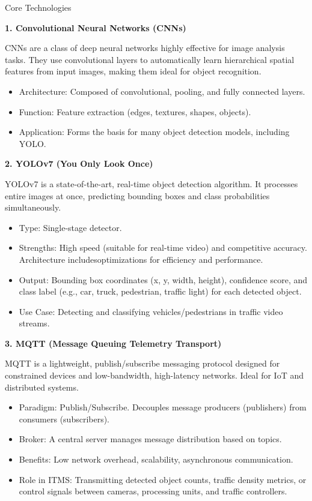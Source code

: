 \documentclass[final]{beamer}
\newlength{\colwidth}
\begin{document}
\begin{frame}[t]
\begin{columns}[t]
\begin{column}{\colwidth}
  \begin{block}{Core Technologies}

    
    \textbf{1. Convolutional Neural Networks (CNNs)} \par
    CNNs are a class of deep neural networks highly effective for image analysis tasks. They use convolutional layers to automatically learn hierarchical spatial features from input images, making them ideal for object recognition.
    \begin{itemize}
      \item Architecture: Composed of convolutional, pooling, and fully connected layers.
      \item Function: Feature extraction (edges, textures, shapes, objects).
      \item Application: Forms the basis for many object detection models, including YOLO.
    \end{itemize}


    \textbf{2. YOLOv7 (You Only Look Once)} \par
    YOLOv7 is a state-of-the-art, real-time object detection algorithm. It processes entire images at once, predicting bounding boxes and class probabilities simultaneously.
    \begin{itemize}
      \item Type: Single-stage detector.
      \item Strengths: High speed (suitable for real-time video) and competitive accuracy. Architecture includesoptimizations for efficiency and performance.
      \item Output: Bounding box coordinates (x, y, width, height), confidence score, and class label (e.g., car, truck, pedestrian, traffic light) for each detected object.
      \item Use Case: Detecting and classifying vehicles/pedestrians in traffic video streams.
    \end{itemize}


    \textbf{3. MQTT (Message Queuing Telemetry Transport)} \par
    MQTT is a lightweight, publish/subscribe messaging protocol designed for constrained devices and low-bandwidth, high-latency networks. Ideal for IoT and distributed systems.
    \begin{itemize}
      \item Paradigm: Publish/Subscribe. Decouples message producers (publishers) from consumers (subscribers).
      \item Broker: A central server manages message distribution based on topics.
      \item Benefits: Low network overhead, scalability, asynchronous communication.
      \item Role in ITMS: Transmitting detected object counts, traffic density metrics, or control signals between cameras, processing units, and traffic controllers.
    \end{itemize}
  \end{block}


\end{column}
\end{columns}
\end{frame}
\end{document}
